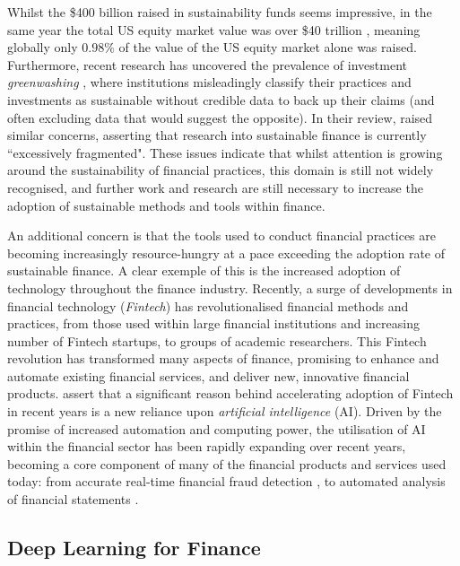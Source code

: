 \documentclass[a4paper, 11pt]{report}
\begin{document}
    Whilst the \$400 billion raised in sustainability funds seems impressive, in the same year the total US equity market value was over \$40 trillion \citep{siblis-2022}, meaning globally only $0.98\%$ of the value of the US equity market alone was raised. Furthermore, recent research has uncovered the prevalence of investment \emph{greenwashing} \citep{popescu-2021}, where institutions misleadingly classify their practices and investments as sustainable without credible data to back up their claims (and often excluding data that would suggest the opposite). In their review, \citet{cunha-2021} raised similar concerns, asserting that research into sustainable finance is currently ``excessively fragmented". These issues indicate that whilst attention is growing around the sustainability of financial practices, this domain is still not widely recognised, and further work and research are still necessary to increase the adoption of sustainable methods and tools within finance. 

    An additional concern is that the tools used to conduct financial practices are becoming increasingly resource-hungry at a pace exceeding the adoption rate of sustainable finance. A clear exemple of this is the increased adoption of technology throughout the finance industry. Recently, a surge of developments in financial technology (\emph{Fintech}) has revolutionalised financial methods and practices, from those used within large financial institutions and increasing number of Fintech startups, to groups of academic researchers. This Fintech revolution has transformed many aspects of finance, promising to enhance and automate existing financial services, and deliver new, innovative financial products. \citet{palmie-2020} assert that a significant reason behind accelerating adoption of Fintech in recent years is a new reliance upon \emph{artificial intelligence} (AI). Driven by the promise of increased automation and computing power, the utilisation of AI within the financial sector has been rapidly expanding over recent years, becoming a core component of many of the financial products and services used today: from accurate real-time financial fraud detection \citep{sadgali-2019}, to automated analysis of financial statements \citep{amel-2020}.


    \subsection{Deep Learning for Finance}
\end{document}

